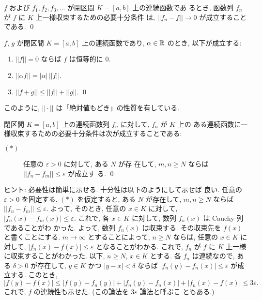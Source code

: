 \documentclass[12pt,twoside]{jarticle}
\begin{document}
\begin{question}
  $f$ および $f_1,f_2,f_3,\ldots$ が閉区間 $K=[a,b]$ 上の連続函数であ
  るとき, 函数列 $f_n$ が $f$ に $K$ 上一様収束するための必要十分条件
  は, $||f_n - f|| \to 0$ が成立することである. \qed
\end{question}

\begin{question}
  $f$, $g$ が閉区間 $K=[a,b]$ 上の連続函数であり, $\alpha\in{\mathbb R}$ のとき,
  以下が成立する:
  \begin{enumerate}
  \item $||f||=0$ ならば $f$ は恒等的に $0$.
  \item $||\alpha f|| = |\alpha|\,||f||$.
  \item $||f+g|| \le ||f|| + ||g||$. 
    \qed
  \end{enumerate}
\end{question}

\noindent このように, $||\cdot||$ は「絶対値もどき」の性質を有している.

\begin{question}\label{q:C0}\qstar{*}
  閉区間 $K = [a,b]$ 上の連続函数列 $f_n$ に対して, $f_n$ が $K$ 上の
  ある連続函数に一様収束するための必要十分条件は次が成立することである:
  \begin{description}
  \item[$(\ast)$] 任意の $\varepsilon > 0$ に対して, ある $N$ が存
    在して, $m,n \ge N$ ならば $||f_n -f_m|| \le \varepsilon$ が成立す
    る.  \qed
  \end{description}
\end{question}

\noindent ヒント: 必要性は簡単に示せる. 十分性は以下のようにして示せば
良い. 任意の $\varepsilon > 0$ を固定する. $(\ast)$ を仮定すると, %
ある $N$ が存在して, %
$m,n\ge N$ ならば $||f_n - f_m|| \le \varepsilon$. %
よって, そのとき, 任意の $x\in K$ に対して, %
$|f_n(x) - f_m(x)| \le \varepsilon$. %
これで, 各 $x\in K$ に対して, 数列 $f_n(x)$ は Cauchy 列であることがわ
かった. よって, 数列 $f_n(x)$ は収束する. %
その収束先を $f(x)$ と書くことにする. %
$m \to \infty$ とすることによって, %
$n \ge N$ ならば, 任意の $x\in K$ に対して, %
$|f_n(x) - f(x)| \le \varepsilon$ となることがわかる. %
これで, $f_n$ が $f$ に $K$ 上一様に収束することがわかった. %
以下, $n \ge N$, $x \in K$ とする. %
各 $f_n$ は連続なので, ある $\delta > 0$ が存在して, %
$y\in K$ かつ $|y - x| < \delta$ ならば %
$|f_n(y) - f_n(x)| \le \varepsilon$ が成立する. %
このとき,
\[
  |f(y) - f(x)|
  \le |f(y) - f_n(y)| + |f_n(y) - f_n(x)| + |f_n(x) - f(x)|
  \le 3 \varepsilon.
\]
これで, $f$ の連続性も示せた. (この論法を $3\varepsilon$ 論法と呼ぶこ
ともある.)
\end{document}
